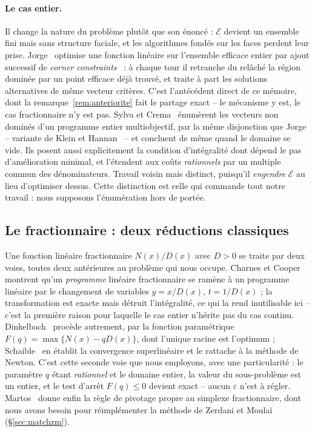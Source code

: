 \documentclass[11pt,a4paper]{article}
\theoremstyle{plain}
\theoremstyle{remark}
\newcommand{\Ecal}{\mathcal{E}}
\begin{document}
\paragraph{Le cas entier.} Il change la nature du problème plutôt que son
énoncé : $\Ecal$ devient un ensemble fini mais sans structure faciale, et
les algorithmes fondés sur les faces perdent leur prise.
Jorge~\cite{jorge2009} optimise une fonction linéaire sur l'ensemble
efficace entier par ajout successif de \emph{corner
constraints}~\cite{klein1982} : à chaque tour il retranche du relâché la
région dominée par un point efficace déjà trouvé, et traite à part les
solutions alternatives de même vecteur critères. C'est l'antécédent direct
de ce mémoire, dont la remarque~\ref{rem:anteriorite} fait le partage
exact -- le mécanisme y est, le cas fractionnaire n'y est pas.
Sylva et Crema~\cite{sylva2004,sylva2007} énumèrent les vecteurs non
dominés d'un programme entier multiobjectif, par la même disjonction que
Jorge -- variante de Klein et Hannan~\cite{klein1982} -- et concluent de
même quand le domaine se vide. Ils posent aussi explicitement la condition
d'intégralité dont dépend le pas d'amélioration minimal, et l'étendent aux
coûts \emph{rationnels} par un multiple commun des dénominateurs. Travail
voisin mais distinct, puisqu'il \emph{engendre} $\Ecal$ au lieu d'optimiser
dessus. Cette distinction est
celle qui commande tout notre travail : nous supposons l'énumération hors
de portée.

\subsection{Le fractionnaire : deux réductions classiques}

Une fonction linéaire fractionnaire $N(x)/D(x)$ avec $D>0$ se traite par
deux voies, toutes deux antérieures au problème qui nous occupe.
Charnes et Cooper~\cite{charnes1962} montrent qu'un \emph{programme}
linéaire fractionnaire se ramène à un programme linéaire par le changement
de variables $y=x/D(x)$, $t=1/D(x)$ ; la transformation est exacte mais
détruit l'intégralité, ce qui la rend inutilisable ici -- c'est la première
raison pour laquelle le cas entier n'hérite pas du cas continu.
Dinkelbach~\cite{dinkelbach1967} procède autrement, par la fonction
paramétrique $F(q)=\max\{N(x)-qD(x)\}$, dont l'unique racine est l'optimum ;
Schaible~\cite{schaible1976} en établit la convergence superlinéaire et le
rattache à la méthode de Newton. C'est cette seconde voie que nous
employons, avec une particularité : le paramètre $q$ étant \emph{rationnel}
et le domaine entier, la valeur du sous-problème est un entier, et le test
d'arrêt $F(q)\le 0$ devient exact -- aucun $\varepsilon$ n'est à régler.
Martos~\cite{martos1964,martos1975} donne enfin la règle de pivotage propre
au simplexe fractionnaire, dont nous avons besoin pour réimplémenter la
méthode de Zerdani et Moulaï (§\ref{sec:matchzm}).
\end{document}
